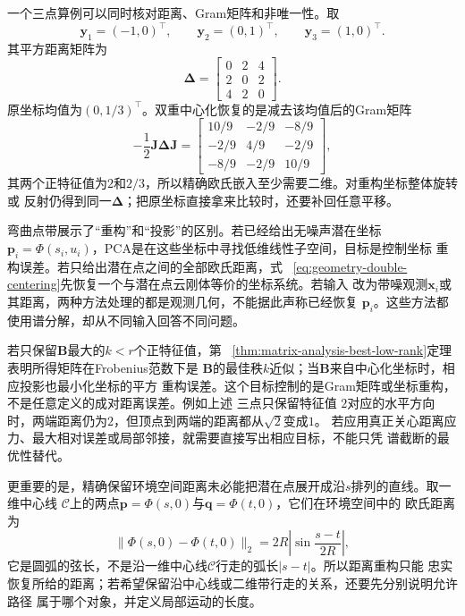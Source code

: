 一个三点算例可以同时核对距离、Gram矩阵和非唯一性。取
\[
  \bm{y}_1=(-1,0)^{\top},\qquad
  \bm{y}_2=(0,1)^{\top},\qquad
  \bm{y}_3=(1,0)^{\top}.
\]
其平方距离矩阵为
\[
  \bm{\Delta}
  =
  \begin{bmatrix}
    0&2&4\\
    2&0&2\\
    4&2&0
  \end{bmatrix}.
\]
原坐标均值为$(0,1/3)^{\top}$。双重中心化恢复的是减去该均值后的Gram矩阵
\begin{equation}
  -\frac12\bm{J}\bm{\Delta}\bm{J}
  =
  \begin{bmatrix}
    10/9&-2/9&-8/9\\
    -2/9&4/9&-2/9\\
    -8/9&-2/9&10/9
  \end{bmatrix},
  \label{eq:geometry-three-point-centered-gram}
\end{equation}
其两个正特征值为$2$和$2/3$，所以精确欧氏嵌入至少需要二维。对重构坐标整体旋转或
反射仍得到同一$\bm{\Delta}$；把原坐标直接拿来比较时，还要补回任意平移。

弯曲点带展示了“重构”和“投影”的区别。若已经给出无噪声潜在坐标
$\bm{p}_i=\Phi(s_i,u_i)$，PCA是在这些坐标中寻找低维线性子空间，目标是控制坐标
重构误差。若只给出潜在点之间的全部欧氏距离，式
~\eqref{eq:geometry-double-centering}先恢复一个与潜在点云刚体等价的坐标系统。若输入
改为带噪观测$\bm{x}_i$或其距离，两种方法处理的都是观测几何，不能据此声称已经恢复
$\bm{p}_i$。这些方法都使用谱分解，却从不同输入回答不同问题。

若只保留$\bm{B}$最大的$k<r$个正特征值，第
~\ref{thm:matrix-analysis-best-low-rank}定理表明所得矩阵在Frobenius范数下是
$\bm{B}$的最佳秩$k$近似；当$\bm{B}$来自中心化坐标时，相应投影也最小化坐标的平方
重构误差。这个目标控制的是Gram矩阵或坐标重构，不是任意定义的成对距离误差。例如上述
三点只保留特征值
$2$对应的水平方向时，两端距离仍为$2$，但顶点到两端的距离都从$\sqrt{2}$变成$1$。
若应用真正关心距离应力、最大相对误差或局部邻接，就需要直接写出相应目标，不能只凭
谱截断的最优性替代。

更重要的是，精确保留环境空间距离未必能把潜在点展开成沿$s$排列的直线。取一维中心线
$\mathcal{C}$上的两点$\bm{p}=\Phi(s,0)$与$\bm{q}=\Phi(t,0)$，它们在环境空间中的
欧氏距离为
\begin{equation}
  \lVert\Phi(s,0)-\Phi(t,0)\rVert_2
  =
  2R\left|\sin\frac{s-t}{2R}\right|,
  \label{eq:geometry-strip-chord-distance}
\end{equation}
它是圆弧的弦长，不是沿一维中心线$\mathcal{C}$行走的弧长$|s-t|$。所以距离重构只能
忠实恢复所给的距离；若希望保留沿中心线或二维带行走的关系，还要先分别说明允许路径
属于哪个对象，并定义局部运动的长度。

